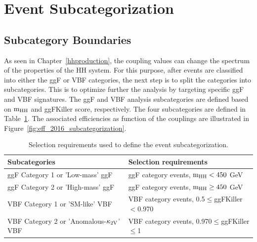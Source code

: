 \clearpage

\section{Event Subcategorization}\label{sec:subcategories}

\subsection{Subcategory Boundaries} \label{subsec:optimization}
As seen in Chapter~\ref{hhproduction}, the coupling values can change the spectrum of the properties of the HH system. For this purpose, after events are classified into either the ggF or VBF categories, the next step is to split the categories into subcategories. This is to optimize further the analysis by targeting specific ggF and VBF signatures. The ggF and VBF analysis subcategories are defined based on $\mathrm{m_{HH}}$ and ggFKiller score, respectively. The four subcategories are defined in Table~\ref{tab:subcategories}. The associated efficiencies as function of the couplings are illustrated in Figure~\ref{fig:eff_2016_subcategorization}.
\begin{table}[ht!]
\caption[Selection requirements used to define the event subcategorization]{\label{tab:subcategories}Selection requirements used to define the event subcategorization.}
\centering
\begin{tabularx}{\textwidth}{XX}
	\hline
	Subcategories                            & Selection requirements\\ [0.2em]
	\hline
	ggF Category 1 or 'Low-mass' ggF         & ggF category events, $\mathrm{m_{HH}}<450$ GeV    \\ [0.2em]
	ggF Category 2 or 'High-mass' ggF        & ggF category events, $\mathrm{m_{HH}}\geq450$ GeV \\ [0.2em]
	VBF Category 1 or 'SM-like' VBF          & VBF category events, 0.5$\leq$ggFKiller$<$0.970  \\ [0.2em]
	VBF Category 2 or 'Anomalous-$\mathrm{\kappa_{2V} }$' VBF & VBF category events, 0.970$\leq$ggFKiller$\leq$1 \\ [0.2em]
	\hline
\end{tabularx}
\end{table}

